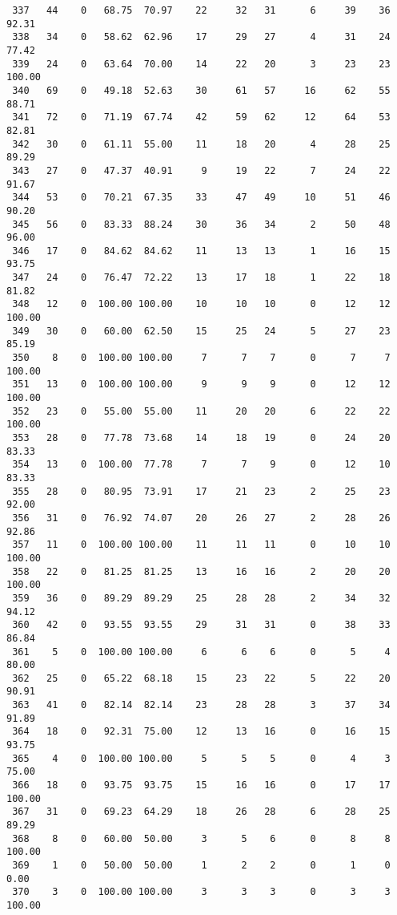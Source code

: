 \begin{verbatim}
 337   44    0   68.75  70.97    22     32   31      6     39    36    92.31
 338   34    0   58.62  62.96    17     29   27      4     31    24    77.42
 339   24    0   63.64  70.00    14     22   20      3     23    23   100.00
 340   69    0   49.18  52.63    30     61   57     16     62    55    88.71
 341   72    0   71.19  67.74    42     59   62     12     64    53    82.81
 342   30    0   61.11  55.00    11     18   20      4     28    25    89.29
 343   27    0   47.37  40.91     9     19   22      7     24    22    91.67
 344   53    0   70.21  67.35    33     47   49     10     51    46    90.20
 345   56    0   83.33  88.24    30     36   34      2     50    48    96.00
 346   17    0   84.62  84.62    11     13   13      1     16    15    93.75
 347   24    0   76.47  72.22    13     17   18      1     22    18    81.82
 348   12    0  100.00 100.00    10     10   10      0     12    12   100.00
 349   30    0   60.00  62.50    15     25   24      5     27    23    85.19
 350    8    0  100.00 100.00     7      7    7      0      7     7   100.00
 351   13    0  100.00 100.00     9      9    9      0     12    12   100.00
 352   23    0   55.00  55.00    11     20   20      6     22    22   100.00
 353   28    0   77.78  73.68    14     18   19      0     24    20    83.33
 354   13    0  100.00  77.78     7      7    9      0     12    10    83.33
 355   28    0   80.95  73.91    17     21   23      2     25    23    92.00
 356   31    0   76.92  74.07    20     26   27      2     28    26    92.86
 357   11    0  100.00 100.00    11     11   11      0     10    10   100.00
 358   22    0   81.25  81.25    13     16   16      2     20    20   100.00
 359   36    0   89.29  89.29    25     28   28      2     34    32    94.12
 360   42    0   93.55  93.55    29     31   31      0     38    33    86.84
 361    5    0  100.00 100.00     6      6    6      0      5     4    80.00
 362   25    0   65.22  68.18    15     23   22      5     22    20    90.91
 363   41    0   82.14  82.14    23     28   28      3     37    34    91.89
 364   18    0   92.31  75.00    12     13   16      0     16    15    93.75
 365    4    0  100.00 100.00     5      5    5      0      4     3    75.00
 366   18    0   93.75  93.75    15     16   16      0     17    17   100.00
 367   31    0   69.23  64.29    18     26   28      6     28    25    89.29
 368    8    0   60.00  50.00     3      5    6      0      8     8   100.00
 369    1    0   50.00  50.00     1      2    2      0      1     0     0.00
 370    3    0  100.00 100.00     3      3    3      0      3     3   100.00

\end{verbatim}
